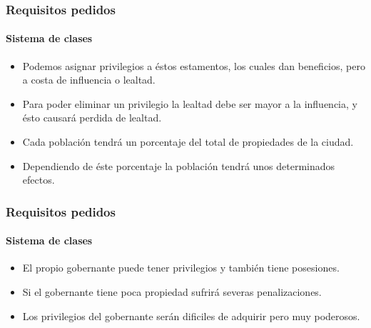 \documentclass[12pt]{beamer}
\begin{document}
    \begin{frame}
        \frametitle{Requisitos pedidos}
        \framesubtitle{Sistema de clases}
        \begin{itemize}
            \item Podemos asignar privilegios a éstos estamentos, los cuales dan beneficios, pero a costa de influencia o lealtad. 
            \item Para poder eliminar un privilegio la lealtad debe ser mayor a la influencia, y ésto causará perdida de lealtad. 
            \item Cada población tendrá un porcentaje del total de propiedades de la ciudad. 
            \item Dependiendo de éste porcentaje la población tendrá unos determinados efectos.
        \end{itemize}
        
    \end{frame}

    \begin{frame}
        \frametitle{Requisitos pedidos}
        \framesubtitle{Sistema de clases}
        \begin{itemize}
            \item El propio gobernante puede tener privilegios y también tiene posesiones. 
            \item Si el gobernante tiene poca propiedad sufrirá severas penalizaciones. 
            \item Los privilegios del gobernante serán dificiles de adquirir pero muy poderosos.
        \end{itemize}
        
    \end{frame}
\end{document}
